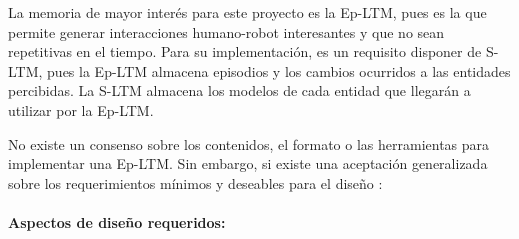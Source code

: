 
La memoria de mayor interés para este proyecto es la Ep-LTM, pues es la que permite generar interacciones humano-robot interesantes y que no sean repetitivas en el tiempo. Para su implementación, es un requisito disponer de S-LTM, pues la Ep-LTM almacena episodios y los cambios ocurridos a las entidades percibidas. La S-LTM almacena los modelos de cada entidad que llegarán a utilizar por la Ep-LTM.

No existe un consenso sobre los contenidos, el formato o las herramientas para implementar una Ep-LTM.
Sin embargo, si existe una aceptación generalizada sobre los requerimientos mínimos y deseables para el diseño \cite{Vijayakumar2014, Ho2009,  Stachowicz2012, Jockel2008}:


\paragraph{Aspectos de diseño requeridos:}




